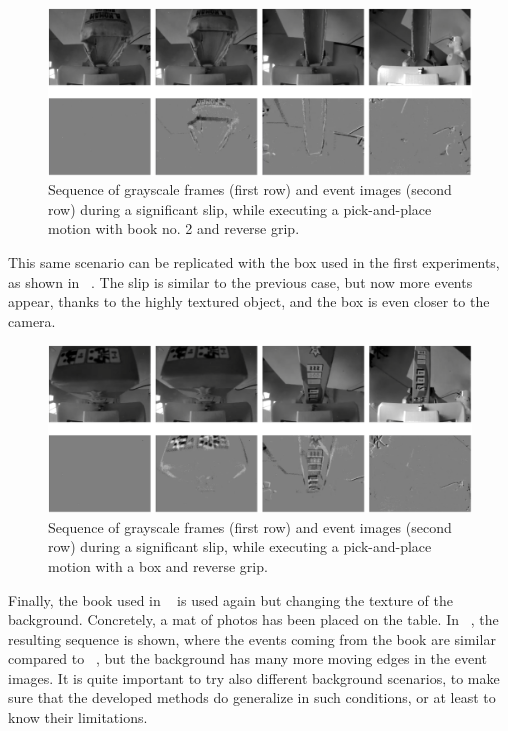 \begin{figure}[h]
    \centering
    \includegraphics[width=\textwidth]{resources/images/set1_case5}
    \caption{Sequence of grayscale frames (first row) and event images (second row) during a significant slip, while executing a pick-and-place motion with book no. 2 and reverse grip.}\label{fig:set1_case5}
\end{figure}

This same scenario can be replicated with the box used in the first experiments, as shown in ~. The slip is similar to the previous case, but now more events appear, thanks to the highly textured object, and the box is even closer to the camera.

\clearpage

\begin{figure}[h]
    \centering
    \includegraphics[width=\textwidth]{resources/images/set1_case6}
    \caption{Sequence of grayscale frames (first row) and event images (second row) during a significant slip, while executing a pick-and-place motion with a box and reverse grip.}\label{fig:set1_case6}
\end{figure}

Finally, the book used in ~ is used again but changing the texture of the background. Concretely, a mat of photos has been placed on the table. In ~, the resulting sequence is shown, where the events coming from the book are similar compared to ~, but the background has many more moving edges in the event images. It is quite important to try also different background scenarios, to make sure that the developed methods do generalize in such conditions, or at least to know their limitations.

